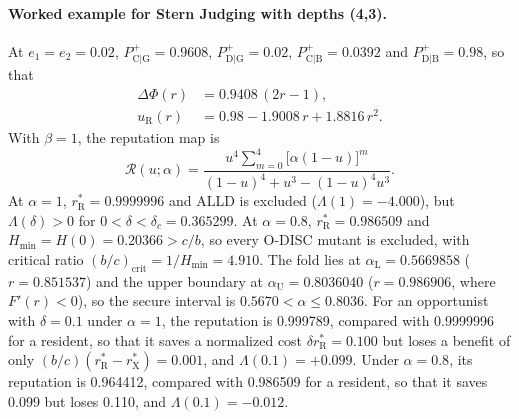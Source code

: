 \documentclass[10pt]{wlscirep}
\newcommand{\Rmap}{\mathscr{R}}            %
\newcommand{\Pp}[1]{P^{+}_{\mathrm{#1}}}   %
\newcommand{\rR}{r_{\mathrm{R}}^{*}}
\newcommand{\rX}{r_{\mathrm{X}}^{*}}
\newcommand{\Hmin}{H_{\min}}
\theoremstyle{plain}
\theoremstyle{remark}
\begin{document}
\paragraph{Worked example for Stern Judging with depths (4,3).} At $e_1=e_2=0.02$, $\Pp{C|G}=0.9608$, $\Pp{D|G}=0.02$, $\Pp{C|B}=0.0392$ and $\Pp{D|B}=0.98$, so that
\begin{equation}
\begin{aligned}
\Delta\Phi(r)&=0.9408\,(2r-1),\\
u_{\mathrm R}(r)&=0.98-1.9008\,r+1.8816\,r^2.
\end{aligned}
\label{eq:s-example-functions}
\end{equation}
With $\beta=1$, the reputation map is
\begin{equation}
\Rmap(u;\alpha)=\frac{u^4\sum_{m=0}^{4}\bigl[\alpha(1-u)\bigr]^m}{(1-u)^4+u^3-(1-u)^4u^3}.
\label{eq:s-example-map}
\end{equation}
At $\alpha=1$, $\rR=0.9999996$ and ALLD is excluded ($\Lambda(1)=-4.000$), but $\Lambda(\delta)>0$ for $0<\delta<\delta_c=0.365299$. At $\alpha=0.8$, $\rR=0.986509$ and $\Hmin=H(0)=0.20366>c/b$, so every O-DISC mutant is excluded, with critical ratio $(b/c)_{\mathrm{crit}}=1/\Hmin=4.910$. The fold lies at $\alpha_{\mathrm L}=0.5669858$ ($r=0.851537$) and the upper boundary at $\alpha_{\mathrm U}=0.8036040$ ($r=0.986906$, where $F'(r)<0$), so the secure interval is $0.5670<\alpha\leq0.8036$. For an opportunist with $\delta=0.1$ under $\alpha=1$, the reputation is 0.999789, compared with 0.9999996 for a resident, so that it saves a normalized cost $\delta\rR=0.100$ but loses a benefit of only $(b/c)(\rR-\rX)=0.001$, and $\Lambda(0.1)=+0.099$. Under $\alpha=0.8$, its reputation is 0.964412, compared with 0.986509 for a resident, so that it saves 0.099 but loses 0.110, and $\Lambda(0.1)=-0.012$.
\end{document}
